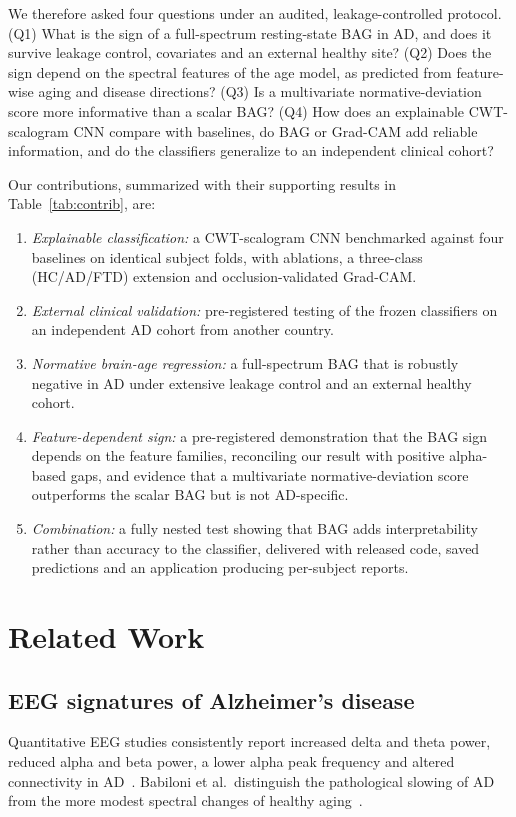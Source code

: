 \documentclass[journal]{IEEEtran}
\begin{document}
We therefore asked four questions under an audited, leakage-controlled protocol. (Q1) What is the sign of a full-spectrum resting-state BAG in AD, and does it survive leakage control, covariates and an external healthy site? (Q2) Does the sign depend on the spectral features of the age model, as predicted from feature-wise aging and disease directions? (Q3) Is a multivariate normative-deviation score more informative than a scalar BAG? (Q4) How does an explainable CWT-scalogram CNN compare with baselines, do BAG or Grad-CAM add reliable information, and do the classifiers generalize to an independent clinical cohort?

Our contributions, summarized with their supporting results in Table~\ref{tab:contrib}, are:
\begin{enumerate}
\item \emph{Explainable classification:} a CWT-scalogram CNN benchmarked against four baselines on identical subject folds, with ablations, a three-class (HC/AD/FTD) extension and occlusion-validated Grad-CAM.
\item \emph{External clinical validation:} pre-registered testing of the frozen classifiers on an independent AD cohort from another country.
\item \emph{Normative brain-age regression:} a full-spectrum BAG that is robustly negative in AD under extensive leakage control and an external healthy cohort.
\item \emph{Feature-dependent sign:} a pre-registered demonstration that the BAG sign depends on the feature families, reconciling our result with positive alpha-based gaps, and evidence that a multivariate normative-deviation score outperforms the scalar BAG but is not AD-specific.
\item \emph{Combination:} a fully nested test showing that BAG adds interpretability rather than accuracy to the classifier, delivered with released code, saved predictions and an application producing per-subject reports.
\end{enumerate}

\section{Related Work}
\subsection{EEG signatures of Alzheimer's disease}
Quantitative EEG studies consistently report increased delta and theta power, reduced alpha and beta power, a lower alpha peak frequency and altered connectivity in AD~\cite{jeong2004,babiloni2020}. Babiloni et al.\ distinguish the pathological slowing of AD from the more modest spectral changes of healthy aging~\cite{babiloni2020}.
\end{document}
